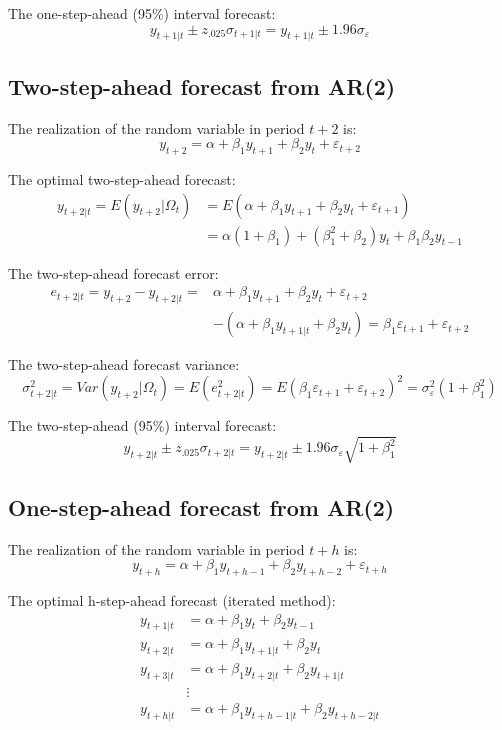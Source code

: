 \documentclass[
  oneside]{book}
\begin{document}
The one-step-ahead (95\%) interval forecast: \[y_{t+1|t} \pm z_{.025}\sigma_{t+1|t} = y_{t+1|t} \pm 1.96\sigma_{\varepsilon}\]

\hypertarget{two-step-ahead-forecast-from-ar2}{%
\subsection{Two-step-ahead forecast from AR(2)}\label{two-step-ahead-forecast-from-ar2}}

The realization of the random variable in period \(t+2\) is: \[y_{t+2} = \alpha + \beta_1 y_{t+1} + \beta_2 y_{t} + \varepsilon_{t+2}\]

The optimal two-step-ahead forecast:
\[\begin{aligned}
y_{t+2|t} = E(y_{t+2}|\Omega_t) &= E(\alpha + \beta_1 y_{t+1} + \beta_2 y_{t} + \varepsilon_{t+1}) \\
&= \alpha(1+\beta_1) + (\beta_1^2+\beta_2) y_{t} + \beta_1\beta_2 y_{t-1}
\end{aligned}\]

The two-step-ahead forecast error:
\[\begin{aligned}
e_{t+2|t} = y_{t+2} - y_{t+2|t} =& \alpha + \beta_1 y_{t+1} + \beta_2 y_{t} + \varepsilon_{t+2} \\
&- (\alpha + \beta_1 y_{t+1|t} + \beta_2 y_{t}) = \beta_1\varepsilon_{t+1} + \varepsilon_{t+2}
\end{aligned}\]

The two-step-ahead forecast variance:
\[\sigma_{t+2|t}^2 = Var(y_{t+2}|\Omega_t) = E(e_{t+2|t}^2) = E(\beta_1\varepsilon_{t+1} + \varepsilon_{t+2})^2 = \sigma_{\varepsilon}^2(1+\beta_1^2)\]

The two-step-ahead (95\%) interval forecast: \[y_{t+2|t} \pm z_{.025}\sigma_{t+2|t} = y_{t+2|t} \pm 1.96\sigma_{\varepsilon}\sqrt{1+\beta_1^2}\]

\hypertarget{one-step-ahead-forecast-from-ar2-1}{%
\subsection{One-step-ahead forecast from AR(2)}\label{one-step-ahead-forecast-from-ar2-1}}

The realization of the random variable in period \(t+h\) is: \[y_{t+h} = \alpha + \beta_1 y_{t+h-1} + \beta_2 y_{t+h-2} + \varepsilon_{t+h}\]

The optimal h-step-ahead forecast (iterated method):
\[\begin{aligned}
y_{t+1|t} &= \alpha + \beta_1 y_t + \beta_2 y_{t-1} \\
y_{t+2|t} &= \alpha + \beta_1 y_{t+1|t} + \beta_2 y_{t} \\
y_{t+3|t} &= \alpha + \beta_1 y_{t+2|t} + \beta_2 y_{t+1|t} \\
&\vdots \\
y_{t+h|t} &= \alpha + \beta_1 y_{t+h-1|t} + \beta_2 y_{t+h-2|t}
\end{aligned}\]
\end{document}
